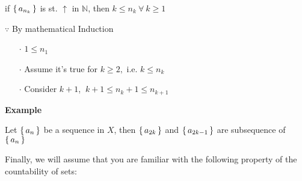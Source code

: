 \begin{rmk*}
	if $\left\{ \,a_{n_k} \,\right\}$ is st. $\uparrow$ in $\mathbb N$, then $k \leq n_k~\forall~k\geq 1$
	
	$\because$ By mathematical Induction
	
	\begin{enumerate}
		\item[$\cdot$] $1 \leq n_1$
		\item[$\cdot$] Assume it's true for $k \geq 2,$ i.e. $k \leq n_k$
		\item[$\cdot$] Consider $k+1$, $~k+1 \leq n_k + 1 \leq n_{k+1}$ 
	\end{enumerate}
	
	\textbf{Example}
	
	Let $\left\{ \,a_n \,\right\}$ be a sequence in $X$, then $\left\{ \,a_{2k} \,\right\}$ and $\left\{ \,a_{2k-1} \,\right\}$ are subsequence of $\left\{ \,a_n \,\right\}$
\end{rmk*}

Finally, we will assume that you are familiar with the following property of the countability of sets:

